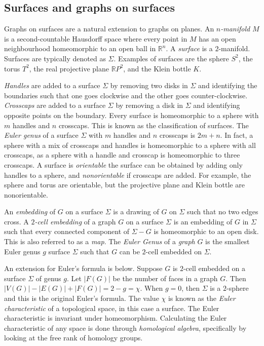 \subsection{Surfaces and graphs on surfaces}
Graphs on surfaces are a natural extension to graphs on planes.
An \textit{$n$-manifold} $M$ is a second-countable Hausdorff space where every point in $M$ has an open neighbourhood homeomorphic to an open ball in $\mathbb{R}^n$.  
A \textit{surface} is a $2$-manifold. Surfaces are typically denoted as $\Sigma$. Examples of surfaces are the sphere $S^2$, the torus $T^2$, the real projective plane $\mathbb{R}P^2$, and the Klein bottle $K$. 

\textit{Handles} are added to a surface \(\Sigma\) by removing two disks in \(\Sigma\) and identifying the boundaries such that one goes clockwise and the other goes counter-clockwise. \textit{Crosscaps} are added to a surface $\Sigma$ by removing a disk in \(\Sigma\) and identifying opposite points on the boundary. Every surface is homeomorphic to a sphere with $m$ handles and $n$ crosscaps. This is known as the classification of surfaces. The \textit{Euler genus} of a surface \(\Sigma\) with $m$ handles and $n$ crosscaps is $2m + n$. In fact, a sphere with a mix of crosscaps and handles is homeomorphic to a sphere with all crosscaps, as a sphere with a handle and crosscap is homeomorphic to three crosscaps. A surface is \textit{orientable} the surface can be obtained by adding only handles to a sphere, and \textit{nonorientable} if crosscaps are added. For example, the sphere and torus are orientable, but the projective plane and Klein bottle are nonorientable. 

An \textit{embedding} of $G$ on a surface $\Sigma$ is a drawing of $G$ on $\Sigma$ such that no two edges cross. 
A \textit{$2$-cell embedding} of a graph $G$ on a surface $\Sigma$ is an embedding of $G$ in $\Sigma$ such that every connected component of $\Sigma - G$ is homeomorphic to an open disk. This is also referred to as a \textit{map}. The \textit{Euler Genus} of a \textit{graph} \(G\) is the smallest Euler genus \(g\) surface \(\Sigma\) such that \(G\) can be $2$-cell embedded on $\Sigma$.

An extension for Euler's formula is below. Suppose $G$ is $2$-cell embedded on a surface $\Sigma$ of genus $g$. Let \(|F(G)|\) be the number of faces in a graph \(G\). Then \(|V(G)| - |E(G)| + |F(G)| = 2 - g = \chi\). When $g = 0$, then $\Sigma$ is a $2$-sphere and this is the original Euler's formula. 
The value $\chi$ is known as the \textit{Euler characteristic} of a topological space, in this case a surface. The Euler characteristic is invariant under homeomorphism. Calculating the Euler characteristic of any space is done through \textit{homological algebra}, specifically by looking at the free rank of homology groups. 

